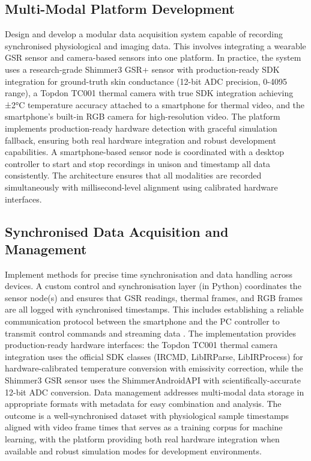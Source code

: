 \subsection{Multi-Modal Platform Development} Design and develop a modular data acquisition system capable of recording synchronised physiological and imaging data. This involves integrating a wearable GSR sensor and camera-based sensors into one platform. In practice, the system uses a research-grade Shimmer3 GSR+ sensor with production-ready SDK integration for ground-truth skin conductance (12-bit ADC precision, 0-4095 range), a Topdon TC001 thermal camera with true SDK integration achieving ±2°C temperature accuracy attached to a smartphone for thermal video, and the smartphone's built-in RGB camera for high-resolution video. The platform implements production-ready hardware detection with graceful simulation fallback, ensuring both real hardware integration and robust development capabilities. A smartphone-based sensor node is coordinated with a desktop controller to start and stop recordings in unison and timestamp all data consistently. The architecture ensures that all modalities are recorded simultaneously with millisecond-level alignment using calibrated hardware interfaces.

\subsection{Synchronised Data Acquisition and Management} Implement methods for precise time synchronisation and data handling across devices. A custom control and synchronisation layer (in Python) coordinates the sensor node(s) and ensures that GSR readings, thermal frames, and RGB frames are all logged with synchronised timestamps. This includes establishing a reliable communication protocol between the smartphone and the PC controller to transmit control commands and streaming data \cite{ref9}. The implementation provides production-ready hardware interfaces: the Topdon TC001 thermal camera integration uses the official SDK classes (IRCMD, LibIRParse, LibIRProcess) for hardware-calibrated temperature conversion with emissivity correction, while the Shimmer3 GSR sensor uses the ShimmerAndroidAPI with scientifically-accurate 12-bit ADC conversion. Data management addresses multi-modal data storage in appropriate formats with metadata for easy combination and analysis. The outcome is a well-synchronised dataset with physiological sample timestamps aligned with video frame times that serves as a training corpus for machine learning, with the platform providing both real hardware integration when available and robust simulation modes for development environments.

